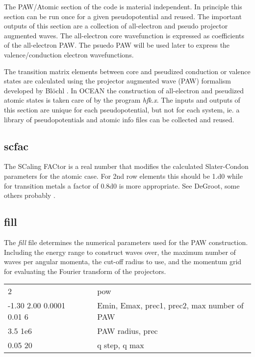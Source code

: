 \documentclass[12pt]{revtex4}
\begin{document}
The PAW/Atomic section of the code is material independent. In principle this section can be run once
for a given pseudopotential and reused. The important outputs of this section are a collection of 
all-electron and pseudo projector augmented waves. The all-electron core wavefunction is expressed
as coefficients of the all-electron PAW. The psuedo PAW will be used later to express the valence/conduction
electron wavefunctions.

The transition matrix elements between core and pseudized conduction or valence states are calculated 
using the projector augmented wave (PAW) formalism developed by Bl\"{o}chl \cite{Bloechl}. In OCEAN
the construction of all-electron and pseudized atomic states is taken care of by the program \emph{hfk.x}. 
The inputs and outputs of this section are unique for each pseudopotential, but not for each system, ie. 
a library of pseudopotentials and atomic info files can be collected and reused.


\subsection{scfac}
The SCaling FACtor is a real number that modifies the calculated Slater-Condon parameters for the atomic case. For 2nd row elements this should be 1.d0 while for transition metals a factor of 0.8d0 is more appropriate. See DeGroot, some others probably \cite{SCFAR}.

\subsection{fill}
The \emph{fill} file determines the numerical parameters used for the PAW construction. Including the energy range to construct waves over, the maximum number of waves per angular momenta, the cut-off radius to use, and the momentum grid for evaluating the Fourier transform of the projectors. 

\begin{center}
\begin{tabular}{| l | c l |}
\hline
2						& &  pow \\
-1.30 2.00 0.0001 0.01 6		& & Emin, Emax, prec1, prec2, max number of PAW \\
3.5 1e6					& & PAW radius, prec \\
0.05 20					& & q step, q max \\
\hline
\end{tabular}
\end{center}
\end{document}
